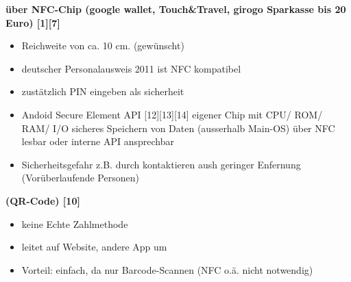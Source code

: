 \textbf{ über NFC-Chip (google wallet, Touch\&Travel, girogo Sparkasse bis 20 Euro) [1][7]}\\
	\begin{itemize}
	\item Reichweite von ca. 10 cm. (gewünscht)
	\item deutscher Personalausweis 2011 ist NFC kompatibel
	\item zustätzlich PIN eingeben als sicherheit
	\item Andoid Secure Element API [12][13][14]
	\subitem  eigener Chip mit CPU/ ROM/ RAM/ I/O
	\subitem  sicheres Speichern von Daten (ausserhalb Main-OS)
	\subitem  über NFC lesbar oder interne API ansprechbar
	\item Sicherheitsgefahr z.B. durch kontaktieren aush geringer Enfernung (Vorüberlaufende Personen)
	\end{itemize}
	
\textbf{ (QR-Code) [10]}\\
	\begin{itemize}
	\item keine Echte Zahlmethode
	\item leitet auf Website, andere App um
	\item Vorteil: einfach, da nur Barcode-Scannen (NFC o.ä. nicht notwendig)
	\end{itemize}

